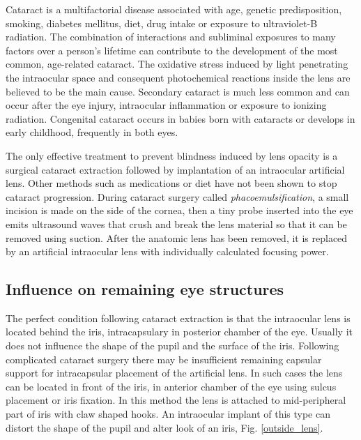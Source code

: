 \documentclass[a4paper]{spie}
\begin{document}
Cataract is a multifactorial disease associated with age, genetic predisposition, smoking, diabetes mellitus, diet, drug intake or exposure to ultraviolet-B radiation. The combination of interactions and subliminal exposures to many factors over a person's lifetime can contribute to the development of the most common, age-related cataract. The oxidative stress induced by light penetrating the intraocular space and consequent photochemical reactions inside the lens are believed to be the main cause. Secondary cataract is much less common and can occur after the eye injury, intraocular inflammation or exposure to ionizing radiation. Congenital cataract occurs in babies born with cataracts or develops in early childhood, frequently in both eyes.

The only effective treatment to prevent blindness induced by lens opacity is a surgical cataract extraction followed by implantation of an intraocular artificial lens. Other methods such as medications or diet have not been shown to stop cataract progression. During cataract surgery called \emph{phacoemulsification}, a small incision is made on the side of the cornea, then a tiny probe inserted into the eye emits ultrasound waves that crush and break the lens material so that it can be removed using suction. After the anatomic lens has been removed, it is replaced by an artificial intraocular lens with individually calculated focusing power.

\subsection{Influence on remaining eye structures}

The perfect condition following cataract extraction is that the intraocular lens is located behind the iris, intracapsulary in posterior chamber of the eye. Usually it does not influence the shape of the pupil and the surface of the iris. Following complicated cataract surgery there may be insufficient remaining capsular support for intracapsular placement of the artificial lens. In such cases the lens can be located in front of the iris, in anterior chamber of the eye using sulcus placement or iris fixation. In this method the lens is attached to mid-peripheral part of iris with claw shaped hooks. An intraocular implant of this type can distort the shape of the pupil and alter look of an iris, Fig. \ref{outside_lens}.
\end{document}
